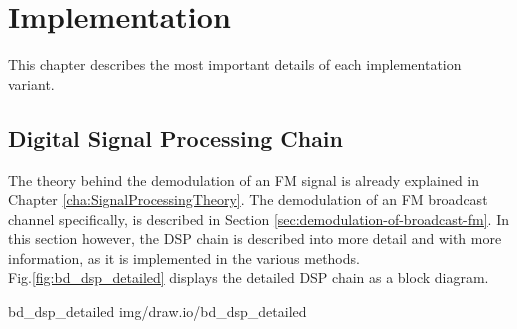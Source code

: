 \chapter{Implementation}
\label{cha:Implementation}

This chapter describes the most important details of each implementation variant.

\section{Digital Signal Processing Chain}

The theory behind the demodulation of an FM signal is already explained in Chapter \ref{cha:SignalProcessingTheory}.
The demodulation of an FM broadcast channel specifically, is described in Section \ref{sec:demodulation-of-broadcast-fm}.
In this section however, the DSP chain is described into more detail and with more information, as it is implemented in the various methods.\\

Fig.\ref{fig:bd_dsp_detailed} displays the detailed DSP chain as a block diagram.

 {bd_dsp_detailed} {img/draw.io/bd_dsp_detailed}

